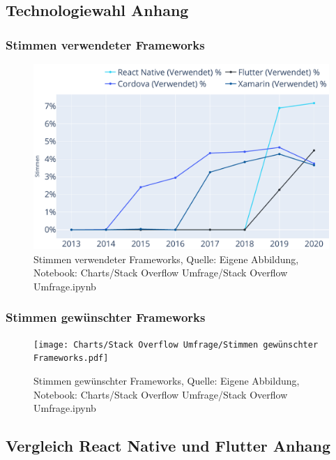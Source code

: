 \subsection{Technologiewahl Anhang} 

\subsubsection{Stimmen verwendeter Frameworks} 

\begin{figure}[H]
	\centering
    \includegraphics[width=1.0\textwidth]{Charts/Stack Overflow Umfrage/Stimmen verwendeter Frameworks.pdf}
	\caption[Stimmen verwendeter Frameworks]{Stimmen verwendeter Frameworks, Quelle: Eigene Abbildung, Notebook: Charts/Stack Overflow Umfrage/Stack Overflow Umfrage.ipynb}
	\label{fig:StimmenVerwendeter Frameworks}
\end{figure}


\subsubsection{Stimmen gewünschter Frameworks} 

\begin{figure}[H]
	\centering
    \texttt{[image: Charts/Stack Overflow Umfrage/Stimmen gewünschter Frameworks.pdf]}
	\caption[Stimmen gewünschter Frameworks]{Stimmen gewünschter Frameworks, Quelle: Eigene Abbildung, Notebook: Charts/Stack Overflow Umfrage/Stack Overflow Umfrage.ipynb}
	\label{fig:StimmenGewuenschterFrameworks}
\end{figure}





\subsection{Vergleich React Native und Flutter Anhang} 


